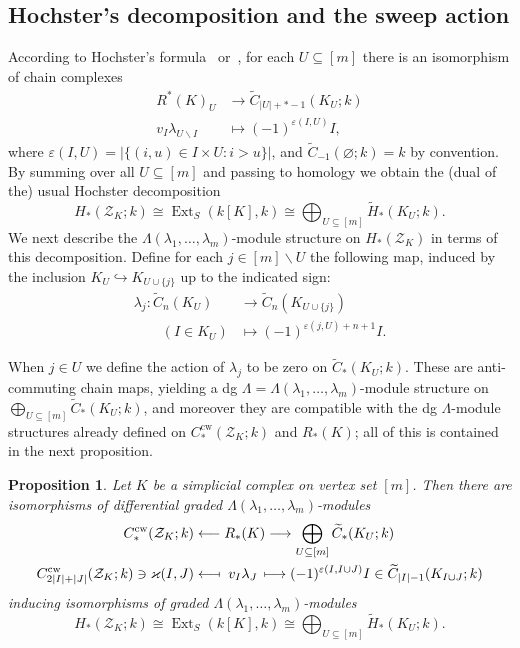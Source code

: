 \documentclass[a4paper,10pt]{amsart}
\newtheorem{proposition}[theorem]{Proposition}
\theoremstyle{definition}
\theoremstyle{remark}
\DeclareMathOperator{\Ext}{Ext}
\begin{document}
\subsection*{Hochster's decomposition and the sweep action} According to Hochster's formula~\cite{H} or~\cite[Theorem~3.2.9]{BP}, for each $U\subseteq [m]$ there is an isomorphism of chain complexes
\[ 
\begin{aligned}
R^*(K)_U &\longrightarrow \widetilde{C}_{|U|+*-1}(K_U;k) \\
v_I\lambda_{U\smallsetminus I} &\longmapsto (-1)^{\varepsilon(I,U)} I,
\end{aligned}
\]
where $\varepsilon(I,U)=|\{(i,u)\in I\times U : i>u\}|$, and $\widetilde{C}_{-1}(\varnothing;k)=k$ by convention. By summing over all $U\subseteq [m]$ and passing to homology we obtain the (dual of the) usual Hochster decomposition
\[ 
H_*(\mathcal{Z}_K;k) \cong \Ext_S(k[K],k) \cong \bigoplus_{U\subseteq [m]} \widetilde{H}_*(K_U;k).
\]
We next describe the $\Lambda(\lambda_1,\ldots,\lambda_m)$-module structure on $H_*(\mathcal{Z}_K)$ in terms of this decomposition. Define for each $j\in [m]\smallsetminus U$ the following map, induced by the inclusion $K_U \hookrightarrow K_{U\cup\{j\}}$ up to the indicated sign:
\begin{align*}
 \lambda_j\colon \widetilde{C}_n(K_U)  
&\longrightarrow\widetilde{C}_n(K_{U\cup\{j\}})\\
\qquad(I\in K_U) &\longmapsto (-1)^{\varepsilon(j,U)+n+1}I.
\end{align*}

When $j\in U$ we define the action of $\lambda_j$ to be zero on $\widetilde{C}_*(K_U;k)$. These are anti-commuting chain maps, yielding a dg $\Lambda=\Lambda(\lambda_1,\ldots,\lambda_m)$-module structure on $\bigoplus_{U\subseteq[m]}\widetilde{C}_*(K_U;k)$, and moreover they are compatible with the dg $\Lambda$-module structures already defined on $C_*^{\mathrm{cw}}(\mathcal{Z}_K;k)$ and $R_*(K)$; all of this is contained in the next proposition.

\begin{proposition} \label{prop_homology_Z_K}
Let $K$ be a simplicial complex on vertex set $[m]$. Then there are isomorphisms of differential graded $\Lambda(\lambda_1,\ldots,\lambda_m)$-modules
\begin{align*}
C_*^{\mathrm{cw}}(\mathcal{Z}_K;k) &\longleftarrow R_*(K) \longrightarrow \bigoplus_{U\subseteq [m]}\widetilde{C}_*(K_U;k) \\
C_{2|I|+|J|}^{\mathrm{cw}}(\mathcal{Z}_K;k) \ni\varkappa(I,J) &\longleftarrow\joinrel\mapstochar \;\,v_I\lambda_J\, \longmapsto (-1)^{\varepsilon(I,I\cup J)}I \in \widetilde{C}_{|I|-1}(K_{I\cup J};k)
\end{align*}
inducing isomorphisms of graded $\Lambda(\lambda_1,\ldots,\lambda_m)$-modules
\[
H_*(\mathcal{Z}_K;k) \cong \Ext_S(k[K],k) \cong \bigoplus_{U\subseteq [m]}\widetilde{H}_*(K_U;k).
\]
\end{proposition}
\end{document}
